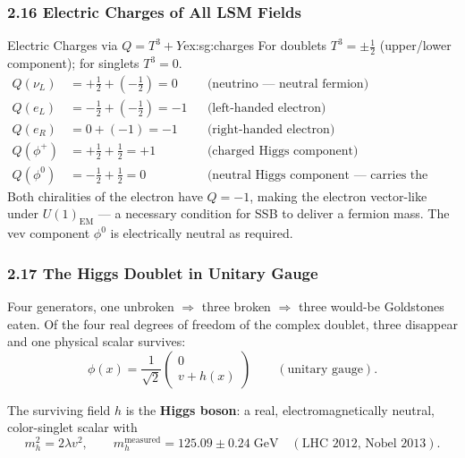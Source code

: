 \documentclass[12pt,a4paper]{article}
\newcommand{\ex}[3][]{\begin{Example}{#2}{#1}#3\end{Example}}
\begin{document}
\subsubsection*{2.16 \quad Electric Charges of All LSM Fields}

\ex[ex:sg:charges]{Electric Charges via $Q = T^3 + Y$}{
For doublets $T^3 = \pm\tfrac{1}{2}$ (upper/lower component); for singlets $T^3 = 0$.
\begin{align*}
  Q(\nu_L) &= +\tfrac{1}{2} + (-\tfrac{1}{2}) = 0 & &\text{(neutrino — neutral fermion)} \\
  Q(e_L)   &= -\tfrac{1}{2} + (-\tfrac{1}{2}) = -1 & &\text{(left-handed electron)} \\
  Q(e_R)   &= 0 + (-1) = -1 & &\text{(right-handed electron)} \\
  Q(\phi^+)&= +\tfrac{1}{2} + \tfrac{1}{2} = +1 & &\text{(charged Higgs component)} \\
  Q(\phi^0)&= -\tfrac{1}{2} + \tfrac{1}{2} = 0 & &\text{(neutral Higgs component — carries the vev)}
\end{align*}
Both chiralities of the electron have $Q = -1$, making the electron vector-like under $U(1)_{\mathrm{EM}}$ — a necessary condition for SSB to deliver a fermion mass. The vev component $\phi^0$ is electrically neutral as required.
}

\subsubsection*{2.17 \quad The Higgs Doublet in Unitary Gauge}

Four generators, one unbroken $\Rightarrow$ three broken $\Rightarrow$ three would-be Goldstones eaten. Of the four real degrees of freedom of the complex doublet, three disappear and one physical scalar survives:
\begin{equation}
  \boxed{\;
  \phi(x) = \frac{1}{\sqrt{2}}\begin{pmatrix}0 \\ v + h(x)\end{pmatrix}
  \qquad(\text{unitary gauge}) .
  \;}
  \label{eq:sg:lsm_unitary}
\end{equation}

The surviving field $h$ is the \textbf{Higgs boson}: a real, electromagnetically neutral, color-singlet scalar with
\begin{equation}
  m_h^2 = 2\lambda v^2 ,
  \qquad
  m_h^{\text{measured}} = 125.09 \pm 0.24\;\text{GeV}
  \quad(\text{LHC 2012, Nobel 2013}) .
\end{equation}
\end{document}
